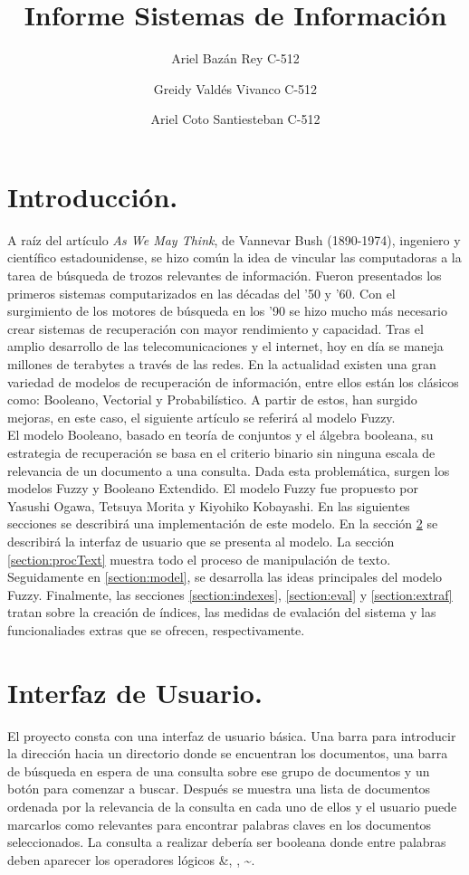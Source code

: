 \documentclass[]{article}
\title{\huge Informe Sistemas de Información}
\author{Ariel Bazán Rey C-512 \and Greidy Valdés Vivanco C-512\and Ariel Coto Santiesteban C-512}
\date{}
\begin{document}
\maketitle

\section{Introducción.}
A raíz del artículo \emph{As We May Think}, de Vannevar Bush (1890-1974), ingeniero y científico estadounidense, se hizo común la idea de vincular las computadoras a la tarea de búsqueda de trozos relevantes de información. Fueron presentados los primeros sistemas computarizados en las décadas del '50 y '60. Con el surgimiento de los motores de búsqueda en los '90 se hizo mucho más necesario crear sistemas de recuperación con mayor rendimiento y capacidad. Tras el amplio desarrollo de las telecomunicaciones y el internet, hoy en día se maneja millones de terabytes a través de las redes. En la actualidad existen una gran variedad de modelos de recuperación de información, entre ellos están los clásicos como: Booleano, Vectorial y Probabilístico. A partir de estos, han surgido mejoras, en este caso, el siguiente artículo se referirá al modelo Fuzzy. \\
El modelo Booleano, basado en teoría de  conjuntos y el álgebra booleana, su estrategia de recuperación se basa en el criterio binario sin ninguna escala de relevancia de un documento a una consulta. Dada esta problemática, surgen los modelos Fuzzy y Booleano Extendido.
El modelo Fuzzy fue propuesto por Yasushi Ogawa, Tetsuya Morita y Kiyohiko Kobayashi. En las siguientes secciones se describirá una implementación de este modelo. En la sección \ref{section:UI} se describirá la interfaz de usuario que se presenta al modelo. La sección \ref{section:procText} muestra todo el proceso de manipulación de texto. Seguidamente en \ref{section:model}, se desarrolla las ideas principales del modelo Fuzzy. Finalmente, las secciones \ref{section:indexes}, \ref{section:eval} y \ref{section:extraf} tratan sobre la creación de índices, las medidas de evalación del sistema y las funcionaliades extras que se ofrecen, respectivamente.

\section{Interfaz de Usuario.}
\label{section:UI}

El proyecto consta con una interfaz de usuario básica. Una barra para introducir la dirección hacia un directorio donde se encuentran los documentos, una barra de búsqueda en espera de una consulta sobre ese grupo de documentos y un botón para comenzar a buscar. Después se muestra una lista de documentos ordenada por la relevancia de la consulta en cada uno de ellos y el usuario puede marcarlos como relevantes para encontrar palabras claves en los documentos seleccionados. La consulta a realizar debería ser booleana donde entre palabras deben aparecer los operadores lógicos \&, \textbar{}, \textasciitilde{}. 
\end{document}
